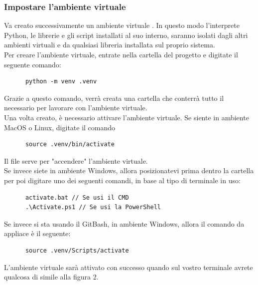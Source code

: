 \documentclass[12pt, letterpaper]{article}
\begin{document}
\subsubsection{Impostare l'ambiente virtuale}

\noindent Va creato successivamente un ambiente virtuale \cite{create-venv}. In questo modo l'interprete Python,
le librerie e gli script installati al suo interno, saranno isolati dagli altri ambienti
virtuali e da qualsiasi libreria installata sul proprio sistema. \\

\noindent Per creare l'ambiente virtuale, entrate nella cartella del progetto e
digitate il seguente comando:

\begin{verbatim}
      python -m venv .venv
\end{verbatim}

\noindent Grazie a questo comando, verrà creata una cartella  che conterrà tutto il
necessario per lavorare con l'ambiente virtuale. \\

\noindent Una volta creato, è necessario attivare l'ambiente virtuale.
Se siente in ambiente MacOS o Linux, digitate il comando

\begin{verbatim}
      source .venv/bin/activate
\end{verbatim}

\noindent Il file  serve per "accendere" l'ambiente virtuale. \\

\noindent Se invece siete in ambiente Windows, allora posizionatevi prima dentro la cartella
 per poi  digitare uno dei seguenti comandi, in base al tipo di terminale in uso:

\begin{verbatim}
      activate.bat // Se usi il CMD
      .\Activate.ps1 // Se usi la PowerShell
\end{verbatim}

\noindent Se invece si sta usando il GitBash, in ambiente Windows, allora il comando da appliace è il seguente:

\begin{verbatim}
      source .venv/Scripts/activate
\end{verbatim}

\noindent L'ambiente virtuale sarà attivato con successo quando sul vostro terminale avrete
qualcosa di simile alla figura 2.
\end{document}
